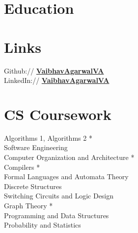 \documentclass[a4paper]{deedy-resume} %
\begin{document}

\begin{minipage}[t]{0.33\textwidth} %

  \section{Education} 



  \sectionspace
  \sectionspace
  \sectionspace


  \sectionspace

  \section{Links} 

  Github:// \href{https://github.com/VaibhavAgarwalVA}{\bf VaibhavAgarwalVA} \\
  LinkedIn:// \href{https://www.linkedin.com/in/VaibhavAgarwalVA}{\bf VaibhavAgarwalVA} \\

  \sectionspace

  \section{CS Coursework}
  Algorithms 1, Algorithms 2 *\\
  Software Engineering \\
  Computer Organization and Architecture *\\
  Compilers *\\
  Formal Languages and Automata Theory \\
  Discrete Structures\\
  Switching Circuits and Logic Design\\
  Graph Theory *\\
  Programming and Data Structures\\
  Probability and Statistics\\


\end{minipage}
\end{document}
